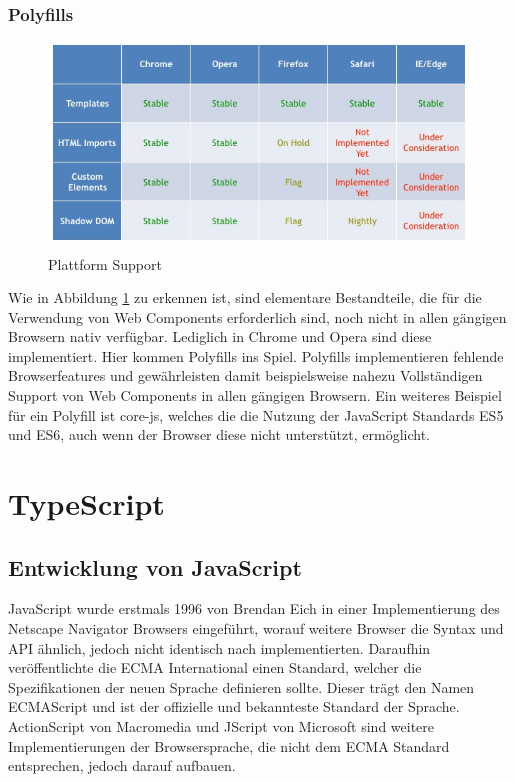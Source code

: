 \subsubsection{Polyfills}
\begin{figure}[htp]
 \centering
 \includegraphics[width=0.7\linewidth]{kapitel2/platform_support.jpg}
 \caption{Plattform Support \cite{WebCo43:online}}
 \label{fig:platform_support}
\end{figure}

\noindent Wie in Abbildung \ref{fig:platform_support} zu erkennen ist, sind elementare Bestandteile, die für die Verwendung von Web Components erforderlich sind, noch nicht in
allen gängigen Browsern nativ verfügbar. Lediglich in Chrome und Opera sind diese implementiert.
Hier kommen Polyfills ins Spiel. Polyfills implementieren fehlende Browserfeatures und gewährleisten damit beispielsweise nahezu Vollständigen
Support von Web Components in allen gängigen Browsern. Ein weiteres Beispiel für ein Polyfill ist core-js,
welches die die Nutzung der JavaScript Standards ES5 und ES6, auch wenn der Browser diese nicht unterstützt, ermöglicht.



\section{TypeScript}

\subsection{Entwicklung von JavaScript}


JavaScript wurde erstmals 1996 von Brendan Eich in einer Implementierung des Netscape Navigator Browsers eingeführt,
worauf weitere Browser die Syntax und API ähnlich, jedoch nicht identisch nach implementierten.
Daraufhin veröffentlichte die ECMA International einen Standard, welcher die Spezifikationen der neuen Sprache
definieren sollte. Dieser trägt den Namen ECMAScript und ist der offizielle und bekannteste Standard der
Sprache. ActionScript von Macromedia und JScript von Microsoft sind weitere Implementierungen der Browsersprache,
die nicht dem ECMA Standard entsprechen, jedoch darauf aufbauen.

